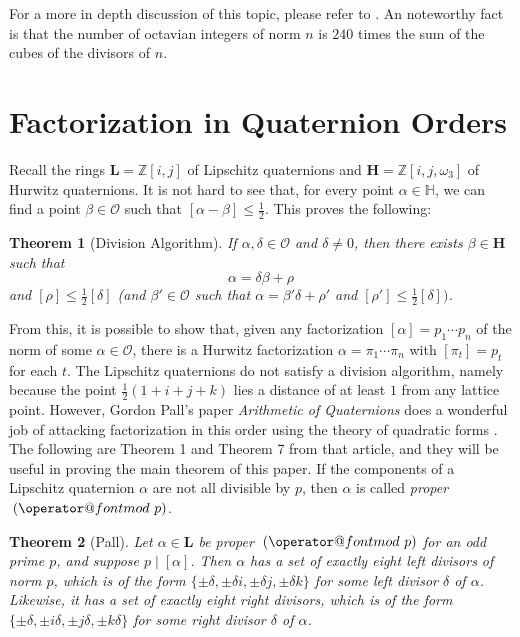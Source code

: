 \documentclass[10pt]{amsart}
\makeatletter
\newcommand{\Z}{\mathbb{Z}}
\renewcommand{\H}{\mathbb{H}}
\renewcommand{\L}{\mathbf{L}}
\newcommand{\HH}{\mathbf{H}}
\newcommand{\Ord}{\mathcal{O}}
\newcommand{\norm}[1]{\left[#1\right]}
\newtheorem{thm}{Theorem}
\DeclareRobustCommand{\pmod}{\@pmods}
\def\@pmods#1{\mkern4mu({\operator@font mod}\mkern 6mu#1)}
\makeatother
\begin{document}
For a more in depth discussion of this topic, please refer to \cite{Co03}.  An noteworthy fact is that the number of octavian integers of norm $n$ is $240$ times the sum of the cubes of the divisors of $n$.




\section{Factorization in Quaternion Orders}

Recall the rings $\L = \Z[i,j]$ of Lipschitz quaternions and $\HH = \Z[i,j,\omega_3]$ of Hurwitz quaternions.  It is not hard to see that, for every point $\alpha \in \H$, we can find a point $\beta \in \Ord$ such that $\norm{\alpha - \beta} \leq \frac12$.  This proves the following:

\begin{thm}[Division Algorithm]
\normalfont
If $\alpha, \delta \in \Ord$ and $\delta \neq 0$, then there exists $\beta \in \HH$ such that
$$
\alpha = \delta \beta + \rho
$$
and $\norm{\rho} \leq \frac12 \norm{\delta}$ (and $\beta' \in \Ord$ such that $\alpha = \beta' \delta + \rho'$ and $\norm{\rho'} \leq \frac12 \norm{\delta})$.
\end{thm}
From this, it is possible to show that, given any factorization $\norm{\alpha} = p_1 \cdots p_n$ of the norm of some $\alpha \in \Ord$, there is a Hurwitz factorization $\alpha = \pi_1 \cdots \pi_n$ with $\norm{\pi_t} = p_t$ for each $t$.  The Lipschitz quaternions do not satisfy a division algorithm, namely because the point $\frac12 (1 + i + j + k)$ lies a distance of at least $1$ from any lattice point.  However, Gordon Pall's paper \emph{Arithmetic of Quaternions} does a wonderful job of attacking factorization in this order using the theory of quadratic forms \cite{Pa40}.  The following are Theorem 1 and Theorem 7 from that article, and they will be useful in proving the main theorem of this paper.  If the components of a Lipschitz quaternion $\alpha$ are not all divisible by $p$, then $\alpha$ is called \emph{proper} $\pmod{p}$.

\begin{thm}[Pall]
\normalfont
Let $\alpha \in \L$ be proper $\pmod{p}$ for an odd prime $p$, and suppose $p \mid \norm{\alpha}$.  Then $\alpha$ has a set of exactly eight left divisors of norm $p$, which is of the form $\{\pm \delta, \pm \delta i, \pm \delta j, \pm \delta k\}$ for some left divisor $\delta$ of $\alpha$.  Likewise, it has a set of exactly eight right divisors, which is of the form $\{\pm \delta, \pm i \delta, \pm j \delta, \pm k \delta\}$ for some right divisor $\delta$ of $\alpha$.
\end{thm}
\end{document}
